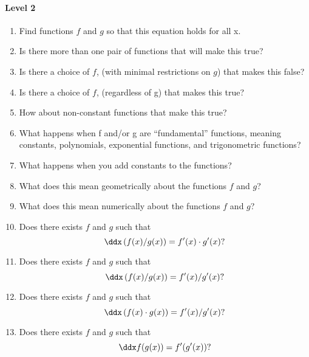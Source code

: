 \documentclass{ximera}
\begin{document}
\paragraph{Level 2}
\begin{enumerate}
\item Find functions $f$ and $g$ so that this equation holds for all x.
\item Is there more than one pair of functions that will make this true?
\item Is there a choice of $f$, (with minimal restrictions on $g$)
  that makes this false?
\item Is there a choice of $f$, (regardless of g) that makes this true?
\item How about non-constant functions that make this true?
\item What happens when f and/or g are ``fundamental'' functions, meaning constants, polynomials, exponential functions, and trigonometric functions?
\item What happens when you add constants to the functions?
\item What does this mean geometrically about the functions $f$ and $g$?
\item What does this mean numerically about the functions $f$ and $g$?
\item Does there exists $f$ and $g$ such that
  \[
  \ddx \left(f(x)/g(x)\right) = f'(x)\cdot g'(x)?
  \]
\item Does there exists $f$ and $g$ such that
  \[
  \ddx \left(f(x)/g(x)\right) = f'(x)/g'(x)?
  \]
  \item Does there exists $f$ and $g$ such that
  \[
  \ddx \left(f(x)\cdot g(x)\right) = f'(x)/g'(x)?
  \]
  \item Does there exists $f$ and $g$ such that
  \[
  \ddx f(g(x)) = f'(g'(x))?
  \]
\end{enumerate}
\end{document}
